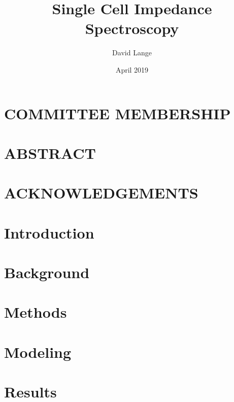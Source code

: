 \documentclass[12pt]{report}
\title{Single Cell Impedance Spectroscopy}
\author{David Lange}
\date{April 2019}
\begin{document}




\chapter*{COMMITTEE MEMBERSHIP}




\chapter*{ABSTRACT}


\chapter*{ACKNOWLEDGEMENTS}


\tableofcontents

\listoffigures

\listoftables

\doublespacing

%
\newpage
{}


\chapter{Introduction}


\chapter{Background}


\chapter{Methods}


\chapter{Modeling}


\chapter{Results}

\end{document}
